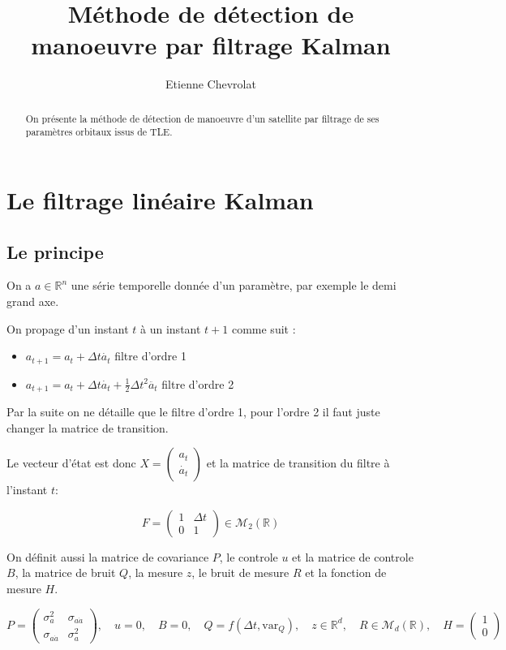 \documentclass{article}
\title{Méthode de détection de manoeuvre par filtrage Kalman}
\author{Etienne Chevrolat}
\date{}
\begin{document}
\maketitle

\begin{abstract}
    On présente la méthode de détection de manoeuvre d'un satellite par filtrage de ses paramètres orbitaux issus de TLE. 
\end{abstract}

\section{Le filtrage linéaire Kalman}

\subsection{Le principe}
On a $a \in \mathbb{R} ^n $ une série temporelle donnée d'un paramètre, par exemple le demi grand axe. 


On propage d'un instant $t$ à un instant $t+1$ comme suit : 

\begin{itemize}
    \item $a_{t+1} = a_t  + \Delta t \dot{a_t}  $ filtre d'ordre 1
    \item $a_{t+1} = a_t  + \Delta t \dot{a_t}  +   \frac{1}{2} \Delta t^2  \ddot{a_t} $ filtre d'ordre 2
\end{itemize}

Par la suite on ne détaille que le filtre d'ordre 1, pour l'ordre 2 il faut juste changer la matrice de transition.

Le vecteur d'état est donc 
$
X = \begin{pmatrix}
a_t \\ 
\dot{a_t}
\end{pmatrix}
$
et la matrice de transition du filtre à l'instant $t$: 

\[
F= \begin{pmatrix}
1 & \Delta t \\ 
0 & 1 
\end{pmatrix} \in \mathcal{M}_2(\mathbb{R}) 
\] 

On définit aussi la matrice de covariance $P$, le controle $u$ et la matrice de controle $B$, la matrice de bruit $Q$, la mesure $z$, le bruit de mesure $R$ et la fonction de mesure $H$. 


\[
P = \begin{pmatrix}
\sigma _a ^2 & \sigma _{a \dot{a}}\\ 
\sigma _{a \dot{a}} &  \sigma _a ^2 
\end{pmatrix},
\quad 
u = 0,
\quad 
B = 0,
\quad 
Q = f( \Delta t , \text{var}_Q),
\quad 
z \in \mathbb{R} ^d, 
\quad 
R  \in \mathcal{M}_d(\mathbb{R}),
\quad 
H = \begin{pmatrix}
1 \\ 
0
\end{pmatrix}
\] 
\end{document}
